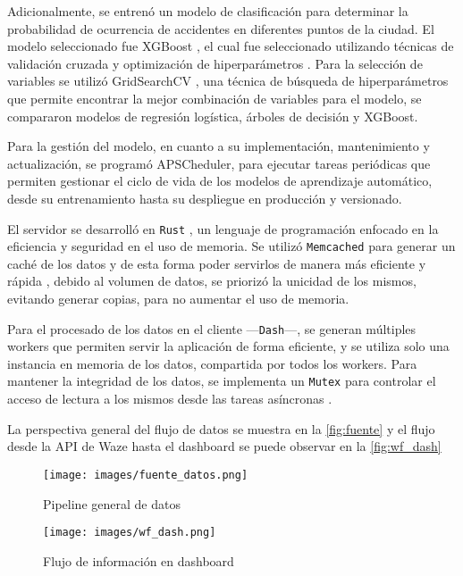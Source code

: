 \documentclass[12pt]{article}
\begin{document}
Adicionalmente, se entrenó un modelo de clasificación para determinar la probabilidad de ocurrencia de accidentes en diferentes puntos de la ciudad. El modelo seleccionado fue XGBoost \parencite{chen2016xgboost}, el cual fue seleccionado utilizando técnicas de validación cruzada y optimización de hiperparámetros \parencite{geron2019hands}. Para la selección de variables se utilizó GridSearchCV \parencite{pedregosa2011scikit, geron2019hands}, una técnica de búsqueda de hiperparámetros que permite encontrar la mejor combinación de variables para el modelo, se compararon modelos de regresión logística, árboles de decisión y XGBoost.

Para la gestión del modelo, en cuanto a su implementación, mantenimiento y actualización, se programó APSCheduler, para ejecutar tareas periódicas que permiten gestionar el ciclo de vida de los modelos de aprendizaje automático, desde su entrenamiento hasta su despliegue en producción y versionado.

El servidor se desarrolló en \texttt{Rust} \parencite{rust2025}, un lenguaje de programación enfocado en la eficiencia y seguridad en el uso de memoria. Se utilizó \texttt{Memcached} para generar un caché de los datos y de esta forma poder servirlos de manera más eficiente y rápida \parencite{fitzpatrick2004memcached}, debido al volumen de datos, se priorizó la unicidad de los mismos, evitando generar copias, para no aumentar el uso de memoria.

Para el procesado de los datos en el cliente —\texttt{Dash}—, se generan múltiples workers que permiten servir la aplicación de forma eficiente, y se utiliza solo una instancia en memoria de los datos, compartida por todos los workers. Para mantener la integridad de los datos, se implementa un \texttt{Mutex} para controlar el acceso de lectura a los mismos desde las tareas asíncronas \parencite{ramalho2015fluent}.

La perspectiva general del flujo de datos se muestra en la \autoref{fig:fuente} y el flujo desde la API de Waze hasta el dashboard se puede observar en la \autoref{fig:wf_dash}

\begin{figure}[H]
    \centering
    \texttt{[image: images/fuente\_datos.png]}
    \caption{Pipeline general de datos}
    \label{fig:fuente}
\end{figure}

\begin{figure}[H]
    \centering
    \texttt{[image: images/wf\_dash.png]}
    \caption{Flujo de información en dashboard}
    \label{fig:wf_dash}
\end{figure}
\end{document}
